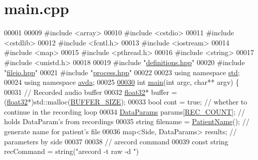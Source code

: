\hypertarget{main_8cpp_source}{\section{main.\+cpp}
\label{main_8cpp_source}
}

\begin{DoxyCode}
00001 
00009 \textcolor{preprocessor}{#include <array>}
00010 \textcolor{preprocessor}{#include <cstdio>}
00011 \textcolor{preprocessor}{#include <cstdlib>}
00012 \textcolor{preprocessor}{#include <fcntl.h>}
00013 \textcolor{preprocessor}{#include <iostream>}
00014 \textcolor{preprocessor}{#include <map>}
00015 \textcolor{preprocessor}{#include <pthread.h>}
00016 \textcolor{preprocessor}{#include <string>}
00017 \textcolor{preprocessor}{#include <unistd.h>}
00018 
00019 \textcolor{preprocessor}{#include "\hyperlink{definitions_8hpp}{definitions.hpp}"}
00020 \textcolor{preprocessor}{#include "\hyperlink{fileio_8hpp}{fileio.hpp}"}
00021 \textcolor{preprocessor}{#include "\hyperlink{process_8hpp}{process.hpp}"}
00022 
00023 \textcolor{keyword}{using namespace }\hyperlink{namespacestd}{std};
00024 \textcolor{keyword}{using namespace }\hyperlink{namespaceavda}{avda};
00025 
\hypertarget{main_8cpp_source_l00030}{}\hyperlink{main_8cpp_a3c04138a5bfe5d72780bb7e82a18e627}{00030} \textcolor{keywordtype}{int} \hyperlink{main_8cpp_a3c04138a5bfe5d72780bb7e82a18e627}{main}(\textcolor{keywordtype}{int} argc, \textcolor{keywordtype}{char}** argv) \{
00031     \textcolor{comment}{// Recorded audio buffer}
00032     \hyperlink{definitions_8hpp_aacdc525d6f7bddb3ae95d5c311bd06a1}{float32}* buffer = (\hyperlink{definitions_8hpp_aacdc525d6f7bddb3ae95d5c311bd06a1}{float32}*)std::malloc(\hyperlink{definitions_8hpp_aca681ed285767aaa2353bf3b42dd60ed}{BUFFER\_SIZE});
00033     \textcolor{keywordtype}{bool} cont = \textcolor{keyword}{true};  \textcolor{comment}{// whether to continue in the recording loop}
00034     \hyperlink{structDataParams}{DataParams} params[\hyperlink{definitions_8hpp_a2fd18fd694a2918f7d73eba821fd10b2}{REC\_COUNT}];  \textcolor{comment}{// holds DataParam's from recordings}
00035     \textcolor{keywordtype}{string} filename = \hyperlink{namespaceavda_ae20728e7e8ae50bf2f74849e538841ea}{PatientName}();  \textcolor{comment}{// generate name for patient's file}
00036     map<Side, DataParams> results;  \textcolor{comment}{// parameters by side}
00037 
00038     \textcolor{comment}{// arecord command}
00039     \textcolor{keyword}{const} \textcolor{keywordtype}{string} recCommand = string(\textcolor{stringliteral}{"arecord -t raw -d "})

\end{DoxyCode}
